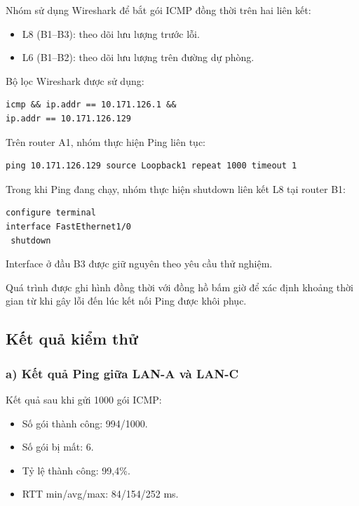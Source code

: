 Nhóm sử dụng Wireshark để bắt gói ICMP đồng thời
trên hai liên kết:
\begin{itemize}
    \item L8 (B1--B3): theo dõi lưu lượng trước lỗi.
    \item L6 (B1--B2): theo dõi lưu lượng
    trên đường dự phòng.
\end{itemize}

Bộ lọc Wireshark được sử dụng:

\begin{lstlisting}
icmp && ip.addr == 10.171.126.1 &&
ip.addr == 10.171.126.129
\end{lstlisting}

Trên router A1, nhóm thực hiện Ping liên tục:

\begin{lstlisting}
ping 10.171.126.129 source Loopback1 repeat 1000 timeout 1
\end{lstlisting}

Trong khi Ping đang chạy, nhóm thực hiện
shutdown liên kết L8 tại router B1:

\begin{lstlisting}
configure terminal
interface FastEthernet1/0
 shutdown
\end{lstlisting}

Interface ở đầu B3 được giữ nguyên theo yêu cầu
thử nghiệm.

Quá trình được ghi hình đồng thời với đồng hồ bấm giờ
để xác định khoảng thời gian từ khi gây lỗi đến lúc
kết nối Ping được khôi phục.

\subsection{Kết quả kiểm thử}

\subsubsection{a) Kết quả Ping giữa LAN-A và LAN-C}

Kết quả sau khi gửi 1000 gói ICMP:

\begin{itemize}
    \item Số gói thành công: 994/1000.
    \item Số gói bị mất: 6.
    \item Tỷ lệ thành công: 99,4\%.
    \item RTT min/avg/max: 84/154/252 ms.
\end{itemize}

